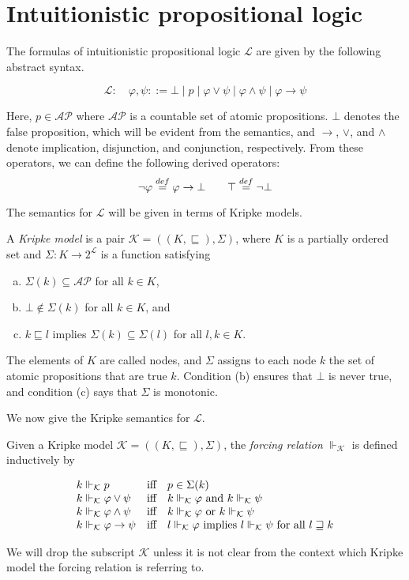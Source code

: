 \section{Intuitionistic propositional logic}
The formulas of intuitionistic propositional logic $\mathcal{L}$
are given by the following abstract syntax.

$$\mathcal{L}: \quad \varphi,\psi ::= \bot \mid p \mid \varphi \lor \psi \mid \varphi \land \psi \mid \varphi \rightarrow \psi$$

Here, $p \in \mathcal{AP}$ where $\mathcal{AP}$ is a countable set of atomic propositions.
$\bot$ denotes the false proposition, which will be evident from the semantics,
and $\rightarrow$, $\lor$, and $\land$ denote implication, disjunction, and conjunction, respectively.
From these operators, we can define the following derived operators:
$$\neg \varphi \stackrel{def}{=} \varphi \rightarrow \bot \quad \quad \top \stackrel{def}{=} \neg \bot$$

The semantics for $\mathcal{L}$ will be given in terms of Kripke models.

\begin{definition}
  A \emph{Kripke model} is a pair $\mathcal{K} = ((K,\sqsubseteq),\Sigma)$,
  where $K$ is a partially ordered set and $\Sigma : K \rightarrow 2^\mathcal{L}$
  is a function satisfying
  \begin{enumerate}[(a)]
    \item $\Sigma(k) \subseteq \mathcal{AP}$ for all $k \in K$,
    \item $\bot \notin \Sigma(k)$ for all $k \in K$, and
    \item $k \sqsubseteq l$ implies $\Sigma(k) \subseteq \Sigma(l)$ for all $l,k \in K$.
  \end{enumerate}
\end{definition}

The elements of $K$ are called nodes,
and $\Sigma$ assigns to each node $k$ the set of atomic propositions that are true $k$.
Condition (b) ensures that $\bot$ is never true,
and condition (c) says that $\Sigma$ is monotonic.

We now give the Kripke semantics for $\mathcal{L}$.

\begin{definition}
  Given a Kripke model $\mathcal{K} = ((K,\sqsubseteq),\Sigma)$,
  the \emph{forcing relation} $\Vdash_\mathcal{K}$ is defined inductively by
  
  $$
  \begin{array}{l l l}
    k \Vdash_\mathcal{K} p                        & \text{iff} & p \in \Sigma(k) \\
    k \Vdash_\mathcal{K} \varphi \lor \psi        & \text{iff} & k \Vdash_\mathcal{K} \varphi \text{ and } k \Vdash_\mathcal{K} \psi \\
    k \Vdash_\mathcal{K} \varphi \land \psi       & \text{iff} & k \Vdash_\mathcal{K} \varphi \text{ or } k \Vdash_\mathcal{K} \psi \\
    k \Vdash_\mathcal{K} \varphi \rightarrow \psi & \text{iff} & l \Vdash_\mathcal{K} \varphi \text{ implies } l \Vdash_\mathcal{K} \psi \text{ for all } l \sqsupseteq k
  \end{array}
  $$
\end{definition}

We will drop the subscript $\mathcal{K}$ unless it is not clear from the context
which Kripke model the forcing relation is referring to.
